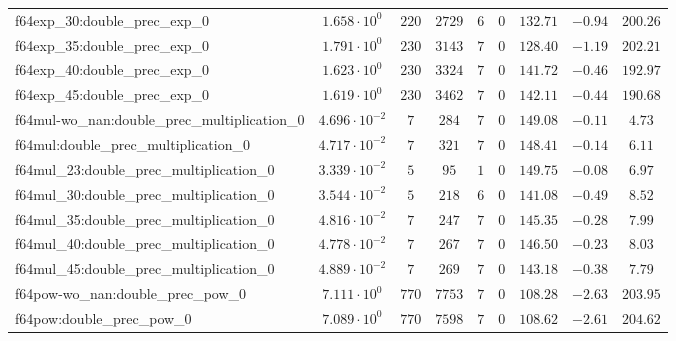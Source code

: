\begin{tabular}{|l|c|c|c|c|c|c|c|c|}
f64exp\_30:double\_prec\_exp\_0                & $ 1.658 \cdot 10^{0}  $ & $ 220    $ & $ 2729   $ & $ 6   $ & $ 0      $ & $ 132.71      $ & $ -0.94   $ & $ 200.26  $ \\
f64exp\_35:double\_prec\_exp\_0                & $ 1.791 \cdot 10^{0}  $ & $ 230    $ & $ 3143   $ & $ 7   $ & $ 0      $ & $ 128.40      $ & $ -1.19   $ & $ 202.21  $ \\
f64exp\_40:double\_prec\_exp\_0                & $ 1.623 \cdot 10^{0}  $ & $ 230    $ & $ 3324   $ & $ 7   $ & $ 0      $ & $ 141.72      $ & $ -0.46   $ & $ 192.97  $ \\
f64exp\_45:double\_prec\_exp\_0                & $ 1.619 \cdot 10^{0}  $ & $ 230    $ & $ 3462   $ & $ 7   $ & $ 0      $ & $ 142.11      $ & $ -0.44   $ & $ 190.68  $ \\
f64mul-wo\_nan:double\_prec\_multiplication\_0 & $ 4.696 \cdot 10^{-2} $ & $ 7      $ & $ 284    $ & $ 7   $ & $ 0      $ & $ 149.08      $ & $ -0.11   $ & $ 4.73    $ \\
f64mul:double\_prec\_multiplication\_0         & $ 4.717 \cdot 10^{-2} $ & $ 7      $ & $ 321    $ & $ 7   $ & $ 0      $ & $ 148.41      $ & $ -0.14   $ & $ 6.11    $ \\
f64mul\_23:double\_prec\_multiplication\_0     & $ 3.339 \cdot 10^{-2} $ & $ 5      $ & $ 95     $ & $ 1   $ & $ 0      $ & $ 149.75      $ & $ -0.08   $ & $ 6.97    $ \\
f64mul\_30:double\_prec\_multiplication\_0     & $ 3.544 \cdot 10^{-2} $ & $ 5      $ & $ 218    $ & $ 6   $ & $ 0      $ & $ 141.08      $ & $ -0.49   $ & $ 8.52    $ \\
f64mul\_35:double\_prec\_multiplication\_0     & $ 4.816 \cdot 10^{-2} $ & $ 7      $ & $ 247    $ & $ 7   $ & $ 0      $ & $ 145.35      $ & $ -0.28   $ & $ 7.99    $ \\
f64mul\_40:double\_prec\_multiplication\_0     & $ 4.778 \cdot 10^{-2} $ & $ 7      $ & $ 267    $ & $ 7   $ & $ 0      $ & $ 146.50      $ & $ -0.23   $ & $ 8.03    $ \\
f64mul\_45:double\_prec\_multiplication\_0     & $ 4.889 \cdot 10^{-2} $ & $ 7      $ & $ 269    $ & $ 7   $ & $ 0      $ & $ 143.18      $ & $ -0.38   $ & $ 7.79    $ \\
f64pow-wo\_nan:double\_prec\_pow\_0            & $ 7.111 \cdot 10^{0}  $ & $ 770    $ & $ 7753   $ & $ 7   $ & $ 0      $ & $ 108.28      $ & $ -2.63   $ & $ 203.95  $ \\
f64pow:double\_prec\_pow\_0                    & $ 7.089 \cdot 10^{0}  $ & $ 770    $ & $ 7598   $ & $ 7   $ & $ 0      $ & $ 108.62      $ & $ -2.61   $ & $ 204.62  $ \\

\end{tabular}
